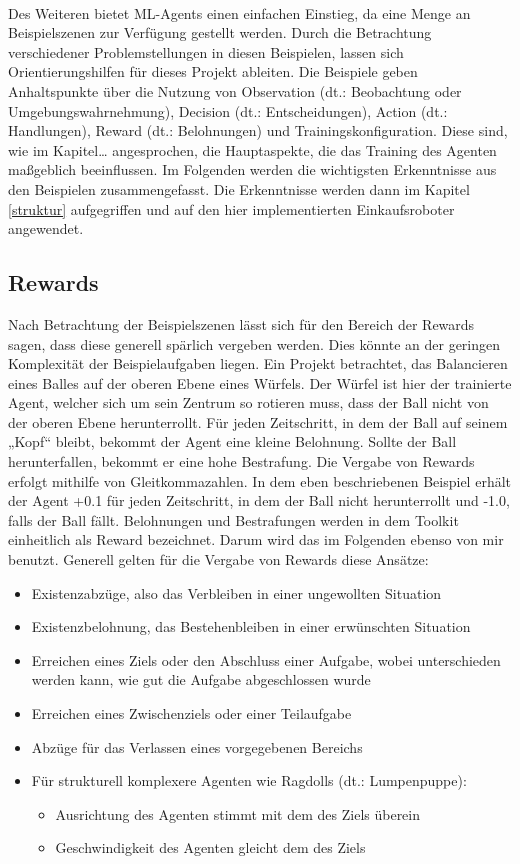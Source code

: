 \\
Des Weiteren bietet ML-Agents einen einfachen Einstieg, da eine Menge an Beispielszenen zur Verfügung gestellt werden. Durch die Betrachtung verschiedener Problemstellungen in diesen Beispielen, lassen sich Orientierungshilfen für dieses Projekt ableiten. Die Beispiele geben Anhaltspunkte über die Nutzung von Observation (dt.: Beobachtung oder Umgebungswahrnehmung), Decision (dt.: Entscheidungen), Action (dt.: Handlungen), Reward (dt.: Belohnungen) und Trainingskonfiguration. Diese sind, wie im Kapitel… angesprochen, die Hauptaspekte, die das Training des Agenten maßgeblich beeinflussen. Im Folgenden werden die wichtigsten Erkenntnisse aus den Beispielen zusammengefasst. Die Erkenntnisse werden dann im Kapitel \ref{struktur} aufgegriffen und auf den hier implementierten Einkaufsroboter angewendet. 

\subsection{Rewards}
\label{rewards}
Nach Betrachtung der Beispielszenen lässt sich für den Bereich der Rewards sagen, dass diese generell spärlich vergeben werden. Dies könnte an der geringen Komplexität der Beispielaufgaben liegen. Ein Projekt betrachtet, das Balancieren eines Balles auf der oberen Ebene eines Würfels. Der Würfel ist hier der trainierte Agent, welcher sich um sein Zentrum so rotieren muss, dass der Ball nicht von der oberen Ebene herunterrollt. Für jeden Zeitschritt, in dem der Ball auf seinem „Kopf“ bleibt, bekommt der Agent eine kleine Belohnung. Sollte der Ball herunterfallen, bekommt er eine hohe Bestrafung. Die Vergabe von Rewards erfolgt mithilfe von Gleitkommazahlen. In dem eben beschriebenen Beispiel erhält der Agent +0.1 für jeden Zeitschritt, in dem der Ball nicht herunterrollt und -1.0, falls der Ball fällt. Belohnungen und Bestrafungen werden in dem Toolkit einheitlich als Reward bezeichnet. Darum wird das im Folgenden ebenso von mir benutzt. Generell gelten für die Vergabe von Rewards diese Ansätze:
\\
\begin{itemize}
	\item Existenzabzüge, also das Verbleiben in einer ungewollten Situation 
	\item Existenzbelohnung, das Bestehenbleiben in einer erwünschten Situation
	\item Erreichen eines Ziels oder den Abschluss einer Aufgabe, wobei unterschieden werden kann, wie gut die Aufgabe abgeschlossen wurde
	\item Erreichen eines Zwischenziels oder einer Teilaufgabe
	\item Abzüge für das Verlassen eines vorgegebenen Bereichs
	\item Für strukturell komplexere Agenten wie Ragdolls (dt.: Lumpenpuppe):
	\begin{itemize}
		\item Ausrichtung des Agenten stimmt mit dem des Ziels überein
		\item Geschwindigkeit des Agenten gleicht dem des Ziels
	\end{itemize} 	 
\end{itemize}

